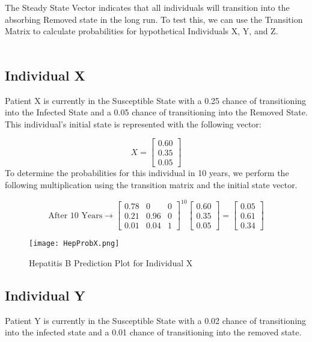 \documentclass{article}
\begin{document}
The Steady State Vector indicates that all individuals will transition into the absorbing Removed state in the long run. To test this, we can use the Transition Matrix to calculate probabilities for hypothetical Individuals X, Y, and Z.
\\ \\
\subsection{Individual X}
Patient X is currently in the Susceptible State with a 0.25 chance of transitioning into the Infected State and a 0.05 chance of transitioning into the Removed State. This individual's initial state is represented with the following vector:

\begin{equation*}
    X = 
    \begin{bmatrix}
   0.60 \\
   0.35 \\
   0.05
   \end{bmatrix}
\end{equation*}
To determine the probabilities for this individual in 10 years, we perform the following multiplication using the transition matrix and the initial state vector.  

\begin{equation*}
\text{After 10 Years}
\longrightarrow
   \begin{bmatrix}
    0.78 & 0 & 0 \\
    0.21 & 0.96 & 0 \\
    0.01 & 0.04 & 1
    \end{bmatrix} ^{10}
    \begin{bmatrix}
        0.60 \\
        0.35 \\
        0.05
   \end{bmatrix}
   =
   \begin{bmatrix}
        0.05 \\
        0.61 \\
        0.34
   \end{bmatrix}
\end{equation*}

\begin{figure}[htp]
    \centering
    \texttt{[image: HepProbX.png]}
    \caption{Hepatitis B Prediction Plot for Individual X}
\end{figure}

\newpage
\subsection{Individual Y}
Patient Y is currently in the Susceptible State with a 0.02 chance of transitioning into the infected state and a 0.01 chance of transitioning into the removed state.
\end{document}

